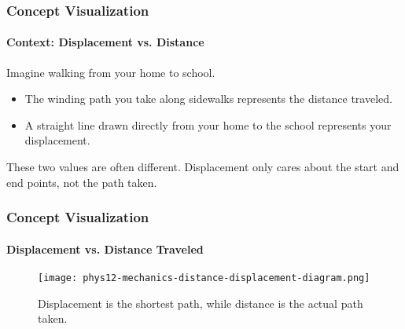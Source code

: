 \documentclass{beamer}
\begin{document}
\begin{frame}
\frametitle{Concept Visualization}
\framesubtitle{Context: Displacement vs. Distance}
Imagine walking from your home to school.
\begin{itemize}
    \item The winding path you take along sidewalks represents the \alert{distance traveled}.
    \item A straight line drawn directly from your home to the school represents your \alert{displacement}.
\end{itemize}
\vspace{1em}
These two values are often different. Displacement only cares about the start and end points, not the path taken.
\end{frame}

\begin{frame}
\frametitle{Concept Visualization}
\framesubtitle{Displacement vs. Distance Traveled}
\begin{figure}
    \centering
    \texttt{[image: phys12-mechanics-distance-displacement-diagram.png]}
    \caption{Displacement is the shortest path, while distance is the actual path taken.}
\end{figure}
\end{frame}
\end{document}
